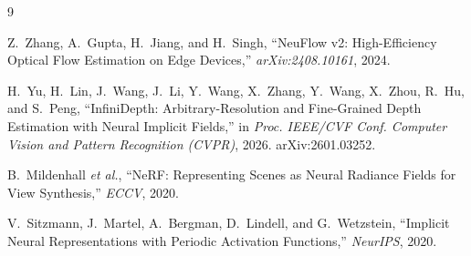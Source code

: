 \documentclass[conference]{IEEEtran}
\begin{document}
\begin{thebibliography}{9}

Z.~Zhang, A.~Gupta, H.~Jiang, and H.~Singh,
``NeuFlow v2: High-Efficiency Optical Flow Estimation on Edge Devices,''
\textit{arXiv:2408.10161}, 2024.

H.~Yu, H.~Lin, J.~Wang, J.~Li, Y.~Wang, X.~Zhang, Y.~Wang, X.~Zhou, R.~Hu, and
S.~Peng, ``InfiniDepth: Arbitrary-Resolution and Fine-Grained Depth Estimation
with Neural Implicit Fields,'' in \textit{Proc. IEEE/CVF Conf. Computer Vision
and Pattern Recognition (CVPR)}, 2026. arXiv:2601.03252.

B.~Mildenhall \textit{et al.},
``NeRF: Representing Scenes as Neural Radiance Fields for View Synthesis,''
\textit{ECCV}, 2020.

V.~Sitzmann, J.~Martel, A.~Bergman, D.~Lindell, and G.~Wetzstein,
``Implicit Neural Representations with Periodic Activation Functions,''
\textit{NeurIPS}, 2020.

\end{thebibliography}
\end{document}
